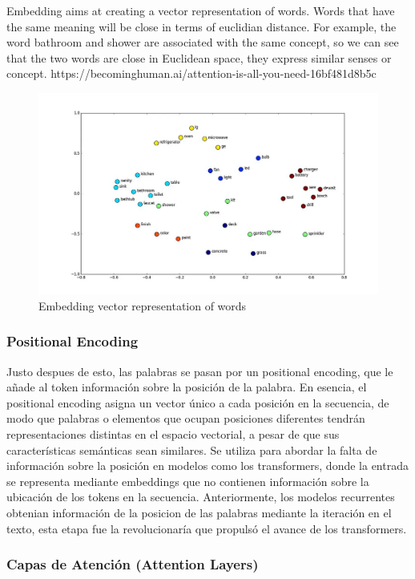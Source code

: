    Embedding aims at creating a vector representation of words. Words that have the same meaning will be close in terms of euclidian distance. For example, the word bathroom and shower are associated with the same concept, so we can see that the two words are close in Euclidean space, they express similar senses or concept.
   https://becominghuman.ai/attention-is-all-you-need-16bf481d8b5c
   \begin{figure}[H]
        \centering
        \includegraphics[width=.45\textwidth]{plantilla-libro/img/espacio_vectorial_encoding.png}
        \caption{Embedding vector representation of words}
        \label{fig:embedding}
    \end{figure}

 \newpage
 \subsubsection{Positional Encoding}
 Justo despues de esto, las palabras se pasan por un positional encoding, que le añade al token información sobre la posición de la palabra.
    En esencia, el positional encoding asigna un vector único a cada posición en la secuencia, de modo que palabras o elementos que ocupan posiciones diferentes tendrán representaciones distintas en el espacio vectorial, a pesar de que sus características semánticas sean similares.
    Se utiliza para abordar la falta de información sobre la posición en modelos como los transformers, donde la entrada se representa mediante embeddings que no contienen información sobre la ubicación de los tokens en la secuencia. Anteriormente, los modelos recurrentes obtenian información de la posicion de las palabras mediante la iteración en el texto, esta etapa fue la revolucionaría que propulsó el avance de los transformers.
\subsubsection{Capas de Atención (Attention Layers)}

